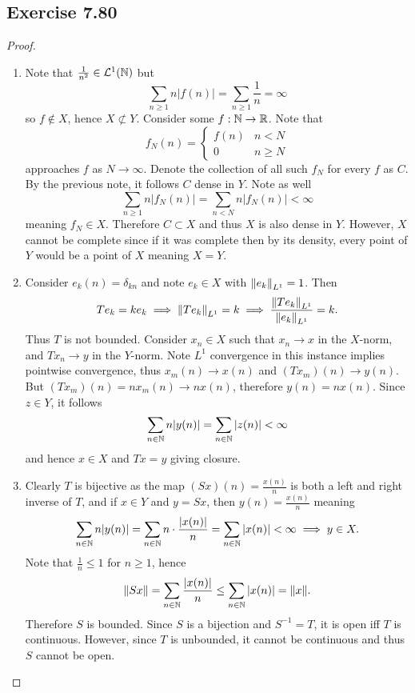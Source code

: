 \documentclass[hw_all.tex]{subfiles}
\begin{document}
\subsection{Exercise 7.80}
\begin{proof}
    \begin{enumerate}
        \item 
            Note that $\frac{1}{n^2} \in \mathcal{L}^1(\mathbb{N})$ but
            \[
                \sum_{n \geq 1} n |f(n)| = \sum_{n \geq 1} \frac{1}{n} = \infty
            \]
            so $f \notin X$, hence $X \not\subset Y$. Consider some $f : \mathbb{N} \to \mathbb{R}$. Note that
            \[
                f_N(n) = \begin{cases}
                    f(n) & n < N \\
                    0 & n \geq N
                \end{cases}
            \]
            approaches $f$ as $N \to \infty$. Denote the collection of all such $f_N$ for every $f$ as $C$. By the previous note, it follows $C$ dense in $Y$. Note as well
            \[
                \sum_{n \geq 1} n |f_N(n)| = \sum_{n < N} n |f_N(n)| < \infty
            \]
            meaning $f_N \in X$. Therefore $C \subset X$ and thus $X$ is also dense in $Y$. However, $X$ cannot be complete since if it was complete then by its density, every point of $Y$ would be a point of $X$ meaning $X = Y$.

        \item 
            Consider $e_k(n) = \delta_{kn}$ and note $e_k \in X$ with $\norm{e_k}_{L^1} = 1$. Then
            \[
                Te_k = k e_k \implies \norm{Te_k}_{L^1} = k \implies \frac{\norm{Te_k}_{L^1}}{\norm{e_k}_{L^1}} = k
            .\]
            Thus $T$ is not bounded. Consider $x_n \in X$ such that $x_n \to x$ in the $X$-norm, and $Tx_n \to y$ in the $Y$-norm. Note $L^1$ convergence in this instance implies pointwise convergence, thus $x_m(n) \to x(n)$ and $(Tx_m)(n) \to y(n)$. But $(Tx_m)(n) = n x_m(n) \to n x(n)$, therefore $y(n) = n x(n)$. Since $z \in Y$, it follows
            \[
                \sum_{n \in \mathbb{N}} n |y(n)| = \sum_{n \in \mathbb{N}} |z(n)| < \infty
            \]
            and hence $x \in X$ and $Tx = y$ giving closure.

        \item 
            Clearly $T$ is bijective as the map $(Sx)(n) = \frac{x(n)}{n}$ is both a left and right inverse of $T$, and if $x \in Y$ and $y = Sx$, then $y(n) = \frac{x(n)}{n}$ meaning
            \[
                \sum_{n \in \mathbb{N}} n |y(n)| = \sum_{n \in \mathbb{N}} n \cdot \frac{|x(n)|}{n} = \sum_{n \in \mathbb{N}} |x(n)| < \infty \implies y \in X
            .\]
            Note that $\frac{1}{n} \leq 1$ for $n \geq 1$, hence
            \[
                \norm{Sx} = \sum_{n \in \mathbb{N}} \frac{|x(n)|}{n} \leq \sum_{n \in \mathbb{N}} |x(n)| = \norm{x}
            .\]
            Therefore $S$ is bounded. Since $S$ is a bijection and $S^{-1} = T$, it is open iff $T$ is continuous. However, since $T$ is unbounded, it cannot be continuous and thus $S$ cannot be open.
    \end{enumerate}
\end{proof}
\end{document}
